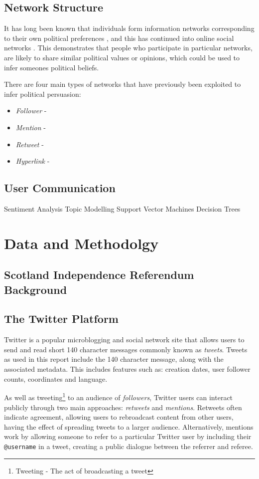 \documentclass[bsc,frontabs,singlespacing,parskip]{infthesis}     %
\begin{document}
\section{Network Structure}

It has long been known that individuals form information networks corresponding to their own political preferences \cite{socialflow}, and this has continued into online social networks \cite{birdsofafeather}. This demonstrates that people who participate in particular networks, are likely to share similar political values or opinions, which could be used to infer someones political beliefs.

There are four main types of networks that have previously been exploited to infer political persuasion:
\begin{itemize}
\item{\textit{Follower} - }
\item{\textit{Mention} - }
\item{\textit{Retweet} - }
\item{\textit{Hyperlink} - }
\end{itemize}

\section{User Communication}

Sentiment Analysis 
Topic Modelling
Support Vector Machines
Decision Trees


\chapter{Data and Methodolgy}
\section{Scotland Independence Referendum Background}
\label{sec:indybackground}
\section{The Twitter Platform}
\label{sec:twitterplatform}
Twitter is a popular microblogging and social network site that allows users to send and read short 140 character messages commonly known as \textit{tweets}. Tweets as used in this report include the 140 character message, along with the associated metadata. This includes features such as: creation dates, user follower counts, coordinates and language. 

As well as tweeting\footnote{Tweeting - The act of broadcasting a tweet} to an audience of \textit{followers}, Twitter users can interact publicly through two main approaches: \textit{retweets} and \textit{mentions}. Retweets often indicate agreement\cite{retweetagreement}, allowing users to rebroadcast content from other users, having the effect of spreading tweets to a larger audience\cite{largeraudiance}. Alternatively, mentions work by allowing someone to refer to a particular Twitter user by including their \texttt{@username} in a tweet, creating a public dialogue between the referrer and referee.
\end{document}
